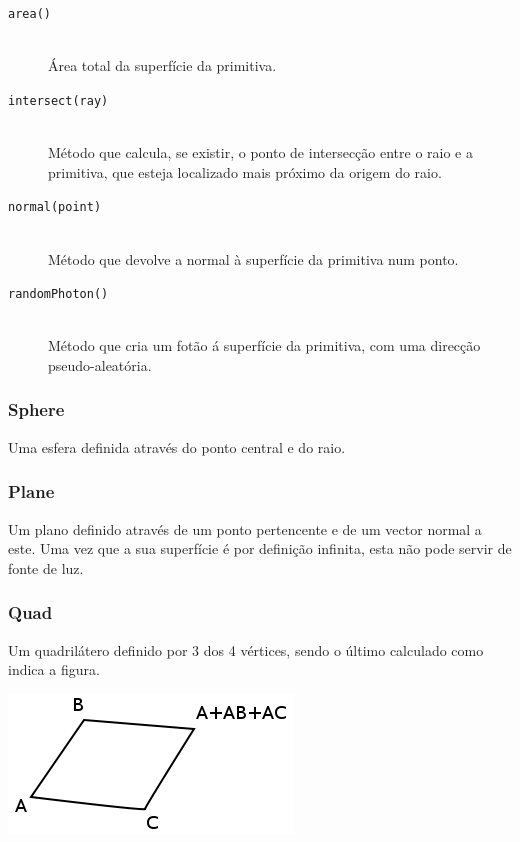\documentclass[a4paper]{article}
\begin{document}
\begin{description}
	\item [\texttt{area()}] \hfill \\
		Área total da superfície da primitiva.

	\item [\texttt{intersect(ray)}] \hfill \\
		Método que calcula, se existir, o ponto de intersecção entre o raio e a primitiva, que esteja localizado
		mais próximo da origem do raio.

	\item [\texttt{normal(point)}] \hfill \\
		Método que devolve a normal à superfície da primitiva num ponto.

	\item [\texttt{randomPhoton()}] \hfill \\
		Método que cria um fotão á superfície da primitiva, com uma direcção pseudo-aleatória.
 
\end{description}

\subsubsection{Sphere}
\indent \indent Uma esfera definida através do ponto central e do raio.   

\subsubsection{Plane}
\indent \indent Um plano definido através de um ponto pertencente e de um vector normal a este.
Uma vez que a sua superfície é por definição infinita, esta não pode servir de fonte de luz.

\subsubsection{Quad}
\indent \indent Um quadrilátero definido por 3 dos 4 vértices, sendo o último calculado como indica a figura.
\begin{center}
	\includegraphics[scale=0.50]{images/quad.png}
	\label{fig:quad}
\end{center}
\end{document}
